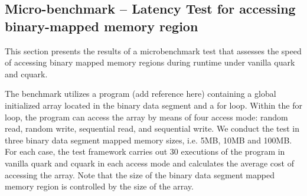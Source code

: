 \subsection{Micro-benchmark – Latency Test for accessing binary-mapped memory region}

This section presents the results of a microbenchmark test that assesses the speed of accessing binary mapped memory regions during runtime under vanilla quark and cquark.

    
     
     
     



 

The benchmark utilizes a program (add reference here) containing a global initialized array located in the binary data segment and a for loop. Within the for loop, the program can access the array by means of four access mode: random read, random write, sequential read, and sequential write. We conduct the 
test in three binary data segment mapped memory sizes, i.e. 5MB, 10MB and 100MB. For each case, the test framework carries out 30 executions of the program in vanilla quark and cquark in each access mode and calculates the average cost of accessing the array. Note that the size of the binary data 
segment mapped memory region is controlled by the size of the array.


